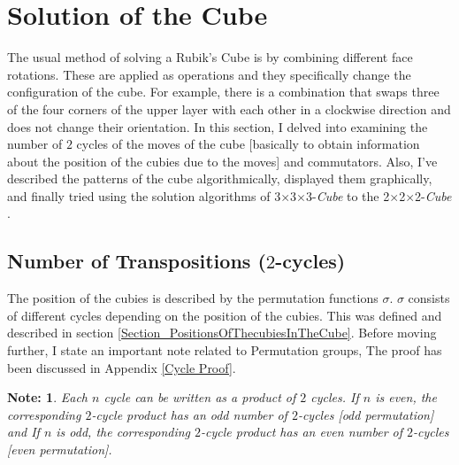 \documentclass[12pt,a4paper]{article}
\theoremstyle{custom}
\newtheorem*{note}{Note:}
\newcommand{\Ttwo}{2$\times$2$\times$2-}
\newcommand{\Tthree}{3$\times$3$\times$3-}
\begin{document}
\section{Solution of the Cube}

\label{Chapter_Solution}

The usual method of solving a Rubik's Cube is by combining different face rotations. These are applied as operations and they specifically change the configuration of the cube.
For example, there is a combination that swaps three of the four corners of the upper layer with each other in a clockwise direction and does not change their orientation.
In this section, I delved into examining the number of $2$ cycles of the moves of the cube [basically to obtain information about the position of the cubies due to the moves] and commutators.
Also, I've described the patterns of the cube algorithmically,  displayed them graphically, and finally tried using the solution algorithms of  \Tthree \textit{Cube} to the \Ttwo \textit{Cube} \cite{fridrich1997, ruwix_advanced_cfop_fridrich, tran_mathematical_approach_rubiks_cube}.

\subsection{Number of Transpositions ($2$-cycles)}

The position of the cubies is described by the permutation functions $\sigma$. $\sigma$ consists of different cycles depending on the position of the cubies. This was defined and described in section \ref{Section_PositionsOfThecubiesInTheCube}. 
Before moving further, I state an important note related to Permutation groups, The proof has been discussed in Appendix \ref{Cycle Proof}.  
\vspace{1cm}
\begin{note}
Each $n$ cycle can be written as a product of $2$ cycles. If $n$ is even, the corresponding $2$-cycle product has an odd number of $2$-cycles [odd permutation] and If $n$ is odd, the corresponding $2$-cycle product has an even number of $2$-cycles [even permutation].   
\end{note}
\end{document}
